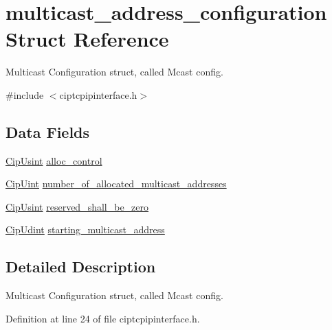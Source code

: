 \hypertarget{structmulticast__address__configuration}{\section{multicast\-\_\-address\-\_\-configuration \-Struct \-Reference}
\label{db/dd7/structmulticast__address__configuration}
}


\-Multicast \-Configuration struct, called \-Mcast config.  




{\ttfamily \#include $<$ciptcpipinterface.\-h$>$}

\subsection*{\-Data \-Fields}
\begin{DoxyCompactItemize}
\item 
\hyperlink{typedefs_8h_a378b726bef4c65cb2ec1c1cdf1205f52}{\-Cip\-Usint} \hyperlink{structmulticast__address__configuration_a3951d5c3e578a8aa1774ce6016ffb056}{alloc\-\_\-control}
\item 
\hyperlink{typedefs_8h_a72c0fba927c5681c44dbf59147578fc7}{\-Cip\-Uint} \hyperlink{structmulticast__address__configuration_a5cb7bf407b6ef9b27e2b033ec7ed1d5c}{number\-\_\-of\-\_\-allocated\-\_\-multicast\-\_\-addresses}
\item 
\hyperlink{typedefs_8h_a378b726bef4c65cb2ec1c1cdf1205f52}{\-Cip\-Usint} \hyperlink{structmulticast__address__configuration_a5cec3a9e7c718c0b875ce9d0dde82f56}{reserved\-\_\-shall\-\_\-be\-\_\-zero}
\item 
\hyperlink{typedefs_8h_aa6230aff6a173bcb6dc949ac85c2e7f1}{\-Cip\-Udint} \hyperlink{structmulticast__address__configuration_a983b98b7087072214bc4fc803b938df3}{starting\-\_\-multicast\-\_\-address}
\end{DoxyCompactItemize}


\subsection{\-Detailed \-Description}
\-Multicast \-Configuration struct, called \-Mcast config. 



\-Definition at line 24 of file ciptcpipinterface.\-h.



